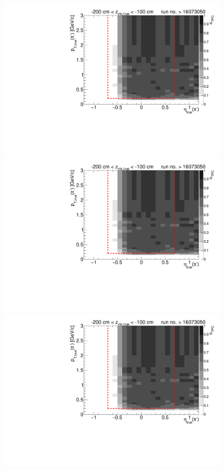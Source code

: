 \begin{figure}[hb]\ContinuedFloat
	\centering
	\parbox{0.495\textwidth}{
		\centering
		\includegraphics[width=\linewidth,page=11]{graphics/eff/Eff2D_TPC_pion_Minus_RunRange2.pdf}\\
		\includegraphics[width=\linewidth,page=13]{graphics/eff/Eff2D_TPC_pion_Minus_RunRange2.pdf}\\
		\includegraphics[width=\linewidth,page=15]{graphics/eff/Eff2D_TPC_pion_Minus_RunRange2.pdf}\\
}
\end{figure}
